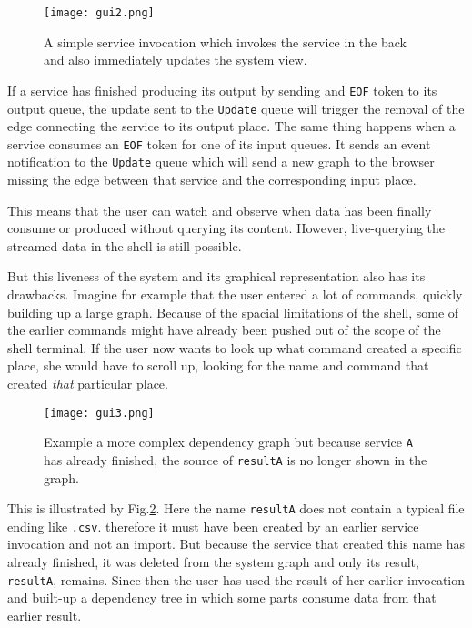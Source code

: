 \begin{figure}[h]
  \texttt{[image: gui2.png]}
  \caption{A simple service invocation which invokes the
           service in the back and also immediately updates
           the system view.}
  \label{gui2}
\end{figure}

If a service has finished producing its output by sending and
\texttt{EOF} token to its output queue, the update sent to the
\texttt{Update} queue will trigger the removal of the edge
connecting the service to its output place. The same thing
happens when a service consumes an \texttt{EOF} token for one
of its input queues. It sends an event notification to the
\texttt{Update} queue which will send a new graph to the
browser missing the edge between that service and the
corresponding input place.

This means that the user can watch and observe when data has been
finally consume or produced without querying its content. However,
live-querying the streamed data in the shell is still possible.
\newline

But this liveness of the system and its graphical representation
also has its drawbacks. Imagine for example that the user entered
a lot of commands, quickly building up a large graph. Because
of the spacial limitations of the shell, some of the earlier commands
might have already been pushed out of the scope of the shell terminal.
If the user now wants to look up what command created a specific
place, she would have to scroll up, looking for the name and command
that created \textit{that} particular place.

\begin{figure}[h]
  \texttt{[image: gui3.png]}
  \caption{Example a more complex dependency graph but because
           service \texttt{A} has already finished, the source
           of \texttt{resultA} is no longer shown in the graph.}
  \label{gui3}
\end{figure}

This is illustrated by Fig.\ref{gui3}. Here the name \texttt{resultA}
does not contain a typical file ending like \texttt{.csv}.
therefore it must have been created by an earlier service invocation
and not an import. But because the service that created this name
has already finished, it was deleted from the system graph and only
its result, \texttt{resultA}, remains. Since then the user has
used the result of her earlier invocation and built-up a
dependency tree in which some parts consume data from that
earlier result.

